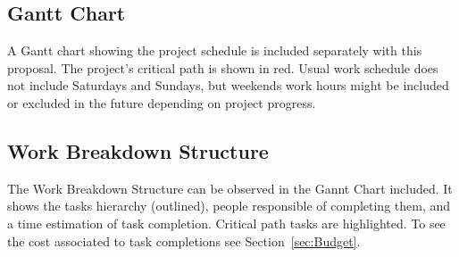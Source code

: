 
\subsection{Gantt Chart}

A Gantt chart showing the project schedule is included separately with this
proposal. The project's critical path is shown in red. Usual work schedule does
not include Saturdays and Sundays, but weekends work hours might be included or excluded in the future depending on project
progress.

\subsection{Work Breakdown Structure}

The Work Breakdown Structure can be observed in the Gannt Chart included. It
shows the tasks hierarchy (outlined), people responsible of completing them, and
a time estimation of task completion. Critical path tasks are highlighted. To
see the cost associated to task completions see Section~\ref{sec:Budget}.
